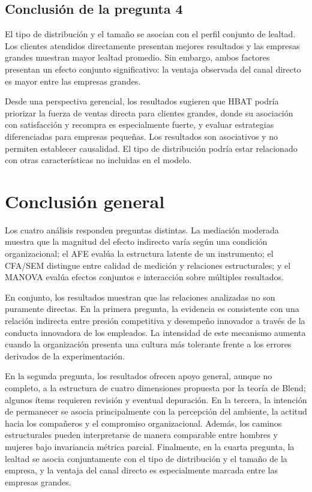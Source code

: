 \documentclass[12pt,letterpaper]{article}
\begin{document}
\subsection{Conclusión de la pregunta 4}

El tipo de distribución y el tamaño se asocian con el perfil conjunto de lealtad. Los clientes atendidos directamente presentan mejores resultados y las empresas grandes muestran mayor lealtad promedio. Sin embargo, ambos factores presentan un efecto conjunto significativo: la ventaja observada del canal directo es mayor entre las empresas grandes.

Desde una perspectiva gerencial, los resultados sugieren que HBAT podría priorizar la fuerza de ventas directa para clientes grandes, donde su asociación con satisfacción y recompra es especialmente fuerte, y evaluar estrategias diferenciadas para empresas pequeñas. Los resultados son asociativos y no permiten establecer causalidad. El tipo de distribución podría estar relacionado con otras características no incluidas en el modelo.

\section{Conclusión general}

Los cuatro análisis responden preguntas distintas. La mediación moderada muestra que la magnitud del efecto indirecto varía según una condición organizacional; el AFE evalúa la estructura latente de un instrumento; el CFA/SEM distingue entre calidad de medición y relaciones estructurales; y el MANOVA evalúa efectos conjuntos e interacción sobre múltiples resultados.

En conjunto, los resultados muestran que las relaciones analizadas no son puramente directas. En la primera pregunta, la evidencia es consistente con una relación indirecta entre presión competitiva y desempeño innovador a través de la conducta innovadora de los empleados. La intensidad de este mecanismo aumenta cuando la organización presenta una cultura más tolerante frente a los errores derivados de la experimentación.

En la segunda pregunta, los resultados ofrecen apoyo general, aunque no completo, a la estructura de cuatro dimensiones propuesta por la teoría de Blend; algunos ítems requieren revisión y eventual depuración. En la tercera, la intención de permanecer se asocia principalmente con la percepción del ambiente, la actitud hacia los compañeros y el compromiso organizacional. Además, los caminos estructurales pueden interpretarse de manera comparable entre hombres y mujeres bajo invariancia métrica parcial. Finalmente, en la cuarta pregunta, la lealtad se asocia conjuntamente con el tipo de distribución y el tamaño de la empresa, y la ventaja del canal directo es especialmente marcada entre las empresas grandes.
\end{document}
